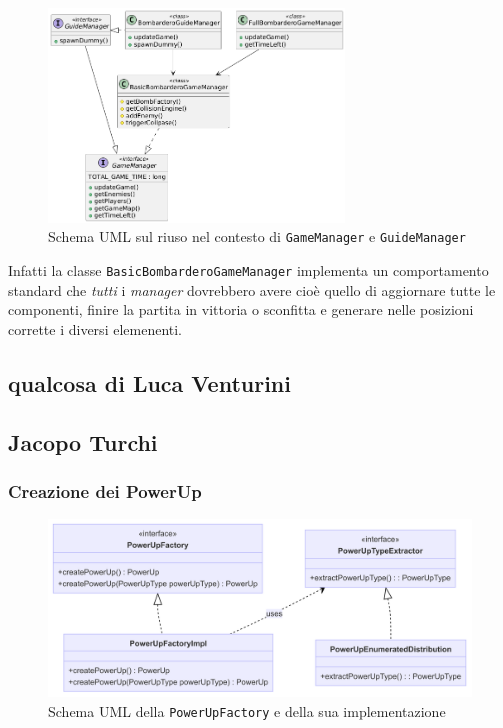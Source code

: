 \documentclass[a4paper,12pt]{report}
\begin{document}
\begin{figure}[H]
    \centering{}
    \includegraphics[width=0.7\textwidth]{img/managers.png}
    \caption{Schema UML sul riuso nel contesto di \texttt{GameManager} e \texttt{GuideManager}}
    \label{img:mapgenerator-gamemap}
\end{figure}

Infatti la classe \texttt{BasicBombarderoGameManager} implementa un comportamento standard che \textit{tutti} i \textit{manager} dovrebbero avere cioè quello di aggiornare tutte le componenti, finire la partita in vittoria o sconfitta e generare nelle posizioni corrette i diversi elemenenti. 

\subsection{qualcosa di Luca Venturini}
\subsection{Jacopo Turchi}


\subsubsection{Creazione dei PowerUp}
\begin{figure}[H]
\centering{}
\includegraphics[width=1.0\columnwidth]{img/power-up-factory-uml.png}
\caption{Schema UML della \texttt{PowerUpFactory} e della sua implementazione}
\label{img:uml-power-up-factory}
\end{figure}
\end{document}

